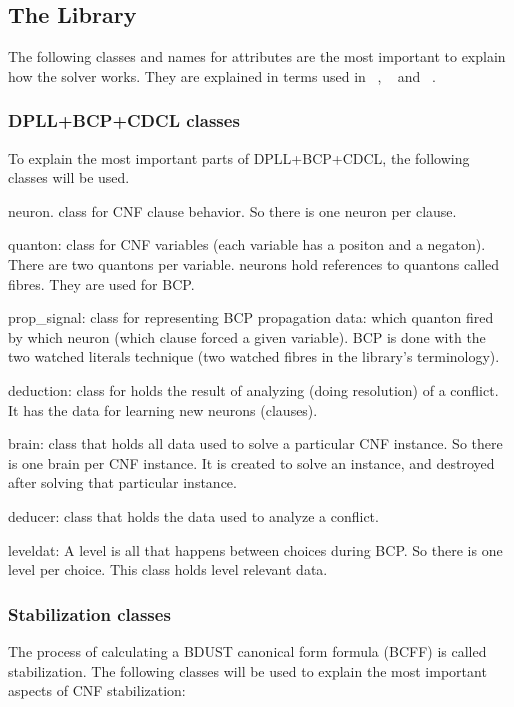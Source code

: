 \documentclass{easychair}
\newcommand{\neuron}{\textsf{neuron}}
\newcommand{\quanton}{\textsf{quanton}}
\newcommand{\propsignal}{\textsf{prop\_signal}}
\newcommand{\deduction}{\textsf{deduction}}
\newcommand{\brain}{\textsf{brain}}
\newcommand{\deducer}{\textsf{deducer}}
\newcommand{\leveldat}{\textsf{leveldat}}
\begin{document}
\subsection{The Library}

The following classes and names for attributes are the most important to explain how the solver works. They are explained in terms used in ~\cite{silva-95}, ~\cite{moskewicz-01} and  ~\cite{bastert-02}.

\subsubsection{DPLL+BCP+CDCL classes}

To explain the most important parts of  DPLL+BCP+CDCL, the following classes will be used.

{\neuron}. class for CNF clause behavior. So there is one {\neuron} per clause.

{\quanton}: class for CNF variables (each variable has a positon and a negaton). There are two {\quanton}s per variable. {\neuron}s hold references to {\quanton}s called fibres. They are used for BCP.

{\propsignal}: class for representing BCP propagation data: which {\quanton} fired by which {\neuron} (which clause forced a given variable). BCP is done with the two watched literals technique (two watched fibres in the library's terminology).

{\deduction}: class for holds the result of analyzing (doing resolution) of a conflict. It has the data for learning new {\neuron}s (clauses).

{\brain}: class that holds all data used to solve a particular CNF instance. So there is one {\brain} per CNF instance. It is created to solve an instance, and destroyed after solving that particular instance.

{\deducer}: class that holds the data used to analyze a conflict.

{\leveldat}: A level is all that happens between choices during BCP. So there is one level per choice. This class holds level relevant data.

\subsubsection{Stabilization classes}

The process of calculating a BDUST canonical form formula (BCFF) is called stabilization. The following classes will be used to explain the most important aspects of CNF stabilization:
\end{document}
